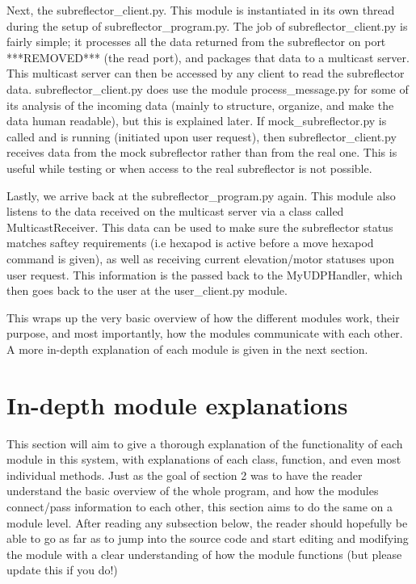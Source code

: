 \documentclass{article}
\begin{document}
Next, the subreflector\_client.py. This module is instantiated in its own thread  during the setup of subreflector\_program.py.  The job of subreflector\_client.py is fairly simple; it  processes all the data returned from the subreflector on port ***REMOVED*** (the read port), and packages that data to a multicast server. This multicast server can then be accessed by any client to read the subreflector data. subreflector\_client.py does use the module process\_message.py for some of its analysis of the incoming data (mainly to structure, organize, and make the data human readable), but this is explained later. If mock\_subreflector.py is called and is running (initiated upon user request), then subreflector\_client.py receives data from the mock subreflector rather than from the real one. This is useful while testing or when access to the real subreflector is not possible. 

\vspace{10pt}

Lastly, we arrive back at the subreflector\_program.py again. This module also listens to the data received on the multicast server via a class called MulticastReceiver. This data can be used to make sure the subreflector status matches saftey requirements  (i.e hexapod is active before a move hexapod command is given), as well as receiving current elevation/motor statuses upon user request. This information is the passed back to the MyUDPHandler, which then goes back to the user at the user\_client.py module.

\vspace{10pt}

This wraps up the very basic overview of how the different modules work, their purpose, and most importantly, how the modules communicate with each other. A  more in-depth explanation of each module is given in the next section. 




\newpage
\section{In-depth module explanations}

This section will aim to give a thorough  explanation of the functionality of each module in this system, with explanations of each class, function, and even most individual methods.  Just as the goal of section 2 was to have the reader understand the basic overview of the whole program, and how the modules connect/pass information to each other, this section aims to do the same on a module level. After reading any subsection below, the reader should hopefully be able to go as far as to jump into the source code and start editing and modifying the module with a clear understanding of how the module functions (but please update this if you do!)
\end{document}
